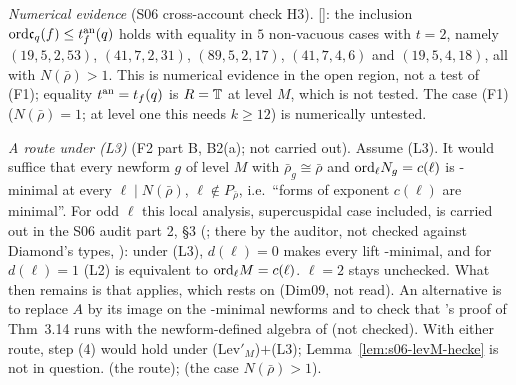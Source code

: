 \begin{remark}
\emph{Numerical evidence} (S06 cross-account check H3). \stcomp{} []: the inclusion
$\mathrm{ord}\mathfrak{c}_q(f)\le t^{\rm an}_f(q)$ holds with equality in $5$ non-vacuous cases with $t=2$, namely $(19,5,2,53)$, $(41,7,2,31)$, $(89,5,2,17)$,
$(41,7,4,6)$ and $(19,5,4,18)$, all with $N(\bar\rho)>1$. This is numerical evidence in the open region, not a test of (F1); equality
$t^{\rm an}=t_f(q)$ is $R=\mathbb{T}$ at level $M$, which is not tested. The case (F1) ($N(\bar\rho)=1$; at level one this needs $k\ge12$) is
numerically untested.

\emph{A route under (L3)} (F2 part B, B2(a); not carried out). Assume (L3). It would suffice that every newform $g$ of level $M$ with
$\bar\rho_g\cong\bar\rho$ and $\mathrm{ord}_\ell N_g=c(\ell)$ is \cite{KO}-minimal at every $\ell\mid N(\bar\rho)$, $\ell\notin P_{\bar\rho}$, i.e.\ ``forms of
exponent $c(\ell)$ are minimal''. For odd $\ell$ this local analysis, supercuspidal case included, is carried out in the S06 audit part 2,
\S3 (; \stproved{} there by the auditor, not checked against Diamond's types,
\cite[\S4]{DDT97}): under (L3), $d(\ell)=0$ makes every lift \cite{KO}-minimal, and for $d(\ell)=1$ (L2) is equivalent to $\mathrm{ord}_\ell M=c(\ell)$.
$\ell=2$ stays unchecked. What then remains is that \cite[Thm~3.14]{KO} applies, which rests on \cite[Lemma~2.4]{KO} (Dim09, not read). An
alternative is to replace $A$ by its image on the \cite{KO}-minimal newforms and to check that \cite{KO}'s proof of Thm~3.14 runs with the
newform-defined algebra of \cite[\S2.1.1]{KO} (not checked). With either route, step (4) would hold under (Lev$'_M$)$+$(L3); Lemma~\ref{lem:s06-levM-hecke} is
not in question. \stsketch{} (the route); \stopen{} (the case $N(\bar\rho)>1$).
\end{remark}

